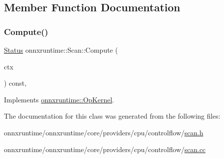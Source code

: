 \subsection{Member Function Documentation}
\mbox{\label{classonnxruntime_1_1Scan_a8b765a2fd147e1ca9d5d2d3d15487953}} 
\subsubsection{\texorpdfstring{Compute()}{Compute()}}
{\footnotesize\ttfamily \mbox{\hyperlink{classonnxruntime_1_1common_1_1Status}{Status}} onnxruntime\+::\+Scan\+::\+Compute (\begin{DoxyParamCaption}\item[{\mbox{\hyperlink{classonnxruntime_1_1OpKernelContext}{Op\+Kernel\+Context}} $\ast$}]{ctx }\end{DoxyParamCaption}) const\hspace{0.3cm}{\ttfamily [override]}, {\ttfamily [virtual]}}



Implements \mbox{\hyperlink{classonnxruntime_1_1OpKernel_a9eca8656a78b1b3ab9d3351a12798650}{onnxruntime\+::\+Op\+Kernel}}.



The documentation for this class was generated from the following files\+:\begin{DoxyCompactItemize}
\item 
onnxruntime/onnxruntime/core/providers/cpu/controlflow/\mbox{\hyperlink{scan_8h}{scan.\+h}}\item 
onnxruntime/onnxruntime/core/providers/cpu/controlflow/\mbox{\hyperlink{scan_8cc}{scan.\+cc}}\end{DoxyCompactItemize}
